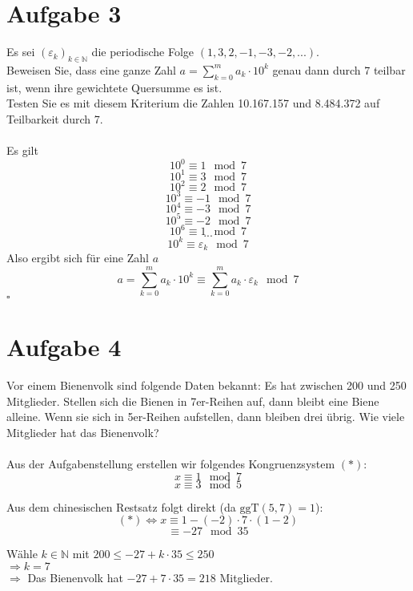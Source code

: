 \documentclass[11pt,a4paper,ngerman]{article}
\newcommand{\N}{\mathbb{N}}
\newcommand{\ggT}{\text{ggT}}
\begin{document}
\section*{Aufgabe 3}
Es sei $(\varepsilon_k)_{k \in \N}$ die periodische Folge $(1,3,2,-1,-3,-2,...)$. \\
Beweisen Sie, dass eine ganze Zahl $a = \sum_{k=0}^{m}{a_k \cdot 10^k}$ genau dann durch 7 teilbar ist, wenn ihre gewichtete Quersumme es ist.\\
Testen Sie es mit diesem Kriterium die Zahlen 10.167.157 und 8.484.372 auf Teilbarkeit durch 7.\\
\\
Es gilt
$$ 10^0 \equiv 1 \mod 7 $$
$$ 10^1 \equiv 3 \mod 7 $$
$$ 10^2 \equiv 2 \mod 7 $$
$$ 10^3 \equiv -1 \mod 7 $$
$$ 10^4 \equiv -3 \mod 7 $$
$$ 10^5 \equiv -2 \mod 7 $$
$$ 10^6 \equiv 1 \mod 7 $$
$$ ... $$
$$ 10^k \equiv \varepsilon_k \mod 7 $$
Also ergibt sich für eine Zahl $a$
$$ a = \sum_{k=0}^{m}{a_k \cdot 10^k} \equiv \sum_{k=0}^{m}{a_k \cdot \varepsilon_k} \mod 7 $$
\mbox{} \hfill $\square$

\section*{Aufgabe 4}
Vor einem Bienenvolk sind folgende Daten bekannt: Es hat zwischen 200 und 250 Mitglieder. Stellen sich die Bienen in 7er-Reihen auf, dann bleibt eine Biene alleine. Wenn sie sich in 5er-Reihen aufstellen, dann bleiben drei übrig. Wie viele Mitglieder hat das Bienenvolk?\\
\\
Aus der Aufgabenstellung erstellen wir folgendes Kongruenzsystem $(*)$: \\

$$ x \equiv 1 \mod 7 $$
$$ x \equiv 3 \mod 5 $$

Aus dem chinesischen Restsatz folgt direkt (da $\ggT(5,7)=1$): \\

$$ (*) \Leftrightarrow x \equiv 1 - (-2) \cdot 7 \cdot (1-2)$$
$$ \equiv -27 \mod 35$$

Wähle $k \in \N$ mit $200 \leq -27 + k \cdot 35 \leq 250$ \\
$ \Rightarrow k = 7 $\\
$ \Rightarrow $ Das Bienenvolk hat $ -27 + 7 \cdot 35 = 218 $ Mitglieder.
\label{LastPage}
\end{document}
